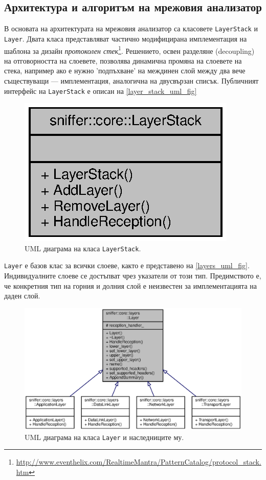 \documentclass[12pt,a4paper,oneside]{book}
\begin{document}
\subsection{Архитектура и алгоритъм на мрежовия анализатор}

В основата на архитектурата на мрежовия анализатор са класовете
\texttt{LayerStack} и \texttt{Layer}. Двата класа представляват частично
модифицирана имплементация на шаблона за дизайн
\textit{протоколен стек}\footnote{\url{http://www.eventhelix.com/RealtimeMantra/PatternCatalog/protocol_stack.htm}}.
Решението, освен разделяне (decoupling) на
отговорността на слоевете, позволява динамична промяна на слоевете на стека,
например ако е нужно 'подпъхване' на междинен слой между два вече съществуващи
--- имплементация, аналогична на двусвързан списък.
Публичният интерфейс на \texttt{LayerStack} е описан на
\autoref{layer_stack_uml_fig}

\begin{figure}[h!]
  \centering
  \includegraphics[scale=.9]{figures/layer_stack_uml.eps}
  \caption{UML диаграма на класа \texttt{LayerStack}.}
  \label{layer_stack_uml_fig}
\end{figure}

\texttt{Layer} е базов клас за всички слоеве, както е представено на
\autoref{layers_uml_fig}.  Индивидуалните слоеве се достъпват чрез указатели
от този тип. Предимството е, че конкретния тип на горния и долния слой е
неизвестен за имплементацията на даден слой.

\begin{figure}[h!]
  \centering
  \includegraphics[scale=.7]{figures/layers_uml.eps}
  \caption{UML диаграма на класа \texttt{Layer} и наследниците му.}
  \label{layers_uml_fig}
\end{figure}
\end{document}
